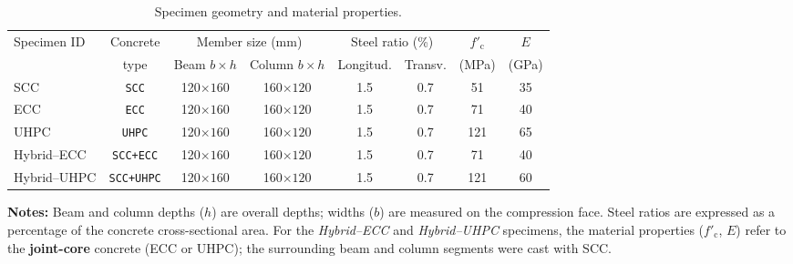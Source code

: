 \documentclass{article}
\begin{document}
\begin{table}[!htbp]
  \centering
  \caption{Specimen geometry and material properties.}
  \label{tab:specimen_props}
  \begin{tabular}{lccccccc}
    \toprule
    \multirow{2}{*}{Specimen ID} &
    Concrete & \multicolumn{2}{c}{Member size (mm)} &
    \multicolumn{2}{c}{Steel ratio (\%)} &
    $f'_\mathrm{c}$ & $E$ \\
    \cmidrule(lr){3-4}\cmidrule(lr){5-6}
     & type & Beam $b\times h$ & Column $b\times h$ &
      Longitud. & Transv. & (MPa) & (GPa) \\
    \midrule
    SCC         & \texttt{SCC}      & 120$\times 160$ & 160$\times 120$ &
                1.5 & 0.7 & 51 & 35 \\
    ECC         & \texttt{ECC}      & 120$\times 160$ & 160$\times 120$ &
                1.5 & 0.7 & 71 & 40 \\
    UHPC        & \texttt{UHPC}    & 120$\times 160$ & 160$\times 120$ &
                1.5 & 0.7 & 121 & 65 \\
    Hybrid--ECC & \texttt{SCC+ECC}     & 120$\times 160$ & 160$\times 120$ &
                1.5 & 0.7 & 71 & 40 \\
    Hybrid--UHPC& \texttt{SCC+UHPC}      & 120$\times 160$ & 160$\times 120$ &
                1.5 & 0.7 & 121 & 60 \\
    \bottomrule
  \end{tabular}




\vspace{2pt} %
  \begin{flushleft}
    \footnotesize
    \textbf{Notes:} Beam and column depths ($h$) are overall depths; widths ($b$)
    are measured on the compression face.  Steel ratios are expressed as a
    percentage of the concrete cross-sectional area.  For the
    \emph{Hybrid–ECC} and \emph{Hybrid–UHPC} specimens, the material properties
    ($f'_\mathrm{c}$, $E$) refer to the \textbf{joint-core} concrete (ECC or
    UHPC); the surrounding beam and column segments were cast with SCC.
  \end{flushleft}

\end{table}
\end{document}
